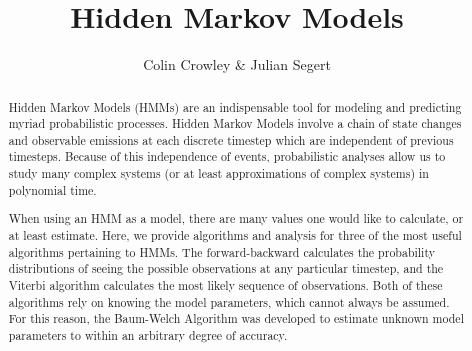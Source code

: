 \documentclass[11pt]{article}
\title{Hidden Markov Models}
\author{Colin Crowley \& Julian Segert}
\date{}
\begin{document}
\maketitle

\begin{abstract}
Hidden Markov Models (HMMs) are an indispensable tool for modeling and predicting myriad probabilistic processes. Hidden Markov Models involve a chain of state changes and observable emissions at each discrete timestep which are independent of previous timesteps. Because of this independence of events, probabilistic analyses allow us to study many complex systems (or at least approximations of complex systems) in polynomial time.

When using an HMM as a model, there are many values one would like to calculate, or at least estimate. Here, we provide algorithms and analysis for three of the most useful algorithms pertaining to HMMs. The forward-backward calculates the probability distributions of seeing the possible observations at any particular timestep, and the Viterbi algorithm calculates the most likely sequence of observations. Both of these algorithms rely on knowing the model parameters, which cannot always be assumed. For this reason, the Baum-Welch Algorithm was developed to estimate unknown model parameters to within an arbitrary degree of accuracy.
\end{abstract}




%
%
%




\appendix
%
%
\end{document}
